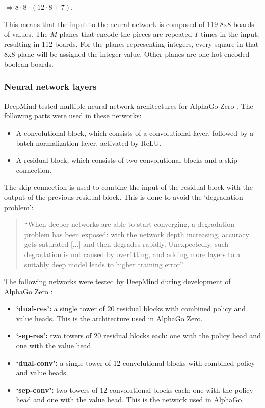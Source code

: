 \documentclass{article}
\begin{document}
$\Rightarrow 8 \cdot 8 \cdot (12 \cdot 8 + 7)$. 

This means that the input to the neural network is composed of 119 8x8 boards of values.
The $M$ planes that encode the pieces are repeated $T$ times in the input, resulting in 112 boards.
For the planes representing integers, every square in that 8x8 plane will be assigned the integer value.
Other planes are one-hot encoded boolean boards.

\subsubsection{Neural network layers}

DeepMind tested multiple neural network architectures for AlphaGo Zero \cite{NeuralNetworksChessprogramming}. 
The following parts were used in these networks:

\begin{itemize}
    \item A convolutional block, which consists of a convolutional layer, followed by a batch normalization layer, activated by ReLU.
    \item A residual block, which consists of two convolutional blocks and a skip-connection.
\end{itemize}

The skip-connection is used to combine the input of the residual block with the output of the previous residual block.
This is done to avoid the `degradation problem':

\begin{quotation}
    ``When deeper networks are able to start converging, a degradation problem has been exposed: 
    with the network depth increasing, accuracy gets saturated [...] and then degrades rapidly. 
    Unexpectedly, such degradation is not caused by overfitting, 
    and adding more layers to a suitably deep model leads to higher training error'' \cite{heDeepResidualLearning2015}
\end{quotation}

The following networks were tested by DeepMind during development of AlphaGo Zero \cite{MasteringGameZero}:

\begin{itemize}
    \item \textbf{`dual-res':} a single tower of 20 residual blocks with combined policy and value heads. This is the architecture used in AlphaGo Zero.
    \item \textbf{`sep-res':} two towers of 20 residual blocks each: one with the policy head and one with the value head.
    \item \textbf{`dual-conv':} a single tower of 12 convolutional blocks with combined policy and value heads.
    \item \textbf{`sep-conv':} two towers of 12 convolutional blocks each: one with the policy head and one with the value head. This is the network used in AlphaGo.
\end{itemize}
\end{document}
